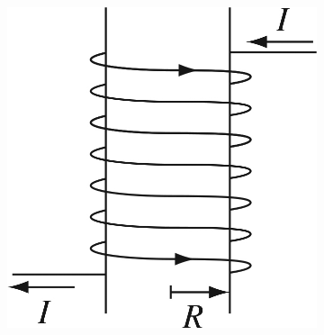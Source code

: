 \documentclass[12pt]{article}
\begin{document}
\begin{figure}[ht]
\centering
\begin{subfigure}{0.12\textwidth}
\includegraphics[width=\textwidth]{figures/5_34.jpg}
\caption{ }
\end{subfigure}
\hfill
\begin{subfigure}{0.07\textwidth}

\end{subfigure}
\end{figure}
\end{document}
